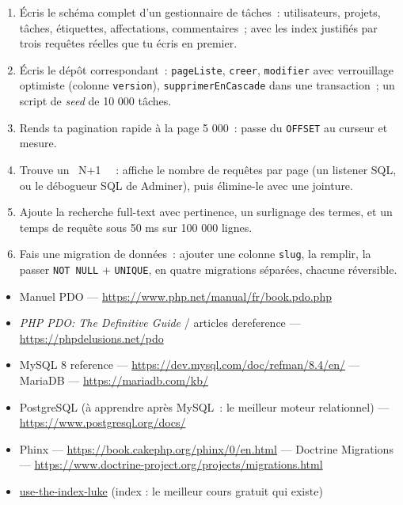 \documentclass[12pt,a4paper,twoside,openright]{book}
\newcommand{\link}[2]{\href{#2}{#1}}
\begin{document}
\begin{exercice}
\begin{enumerate}
  \item \'Ecris le sch\'ema complet d'un gestionnaire de t\^aches~: utilisateurs, projets, t\^aches,
        \'etiquettes, affectations, commentaires~; avec les index justifi\'es par trois requ\^etes
        r\'eelles que tu \'ecris en premier.
  \item \'Ecris le d\'ep\^ot correspondant~: \verb|pageListe|, \verb|creer|, \verb|modifier| avec
        verrouillage optimiste (colonne \verb|version|), \verb|supprimerEnCascade| dans une
        transaction~; un script de \emph{seed} de 10 000 t\^aches.
  \item Rends ta pagination rapide \`a la page 5 000~: passe du \verb|OFFSET| au curseur et mesure.
  \item Trouve un \og ~N+1~ \fg{}~: affiche le nombre de requ\^etes par page (un listener SQL, ou le
        d\'ebogueur SQL de Adminer), puis \'elimine-le avec une jointure.
  \item Ajoute la recherche full-text avec pertinence, un surlignage des termes, et un temps
        de requ\^ete sous 50 ms sur 100 000 lignes.
  \item Fais une migration de donn\'ees~: ajouter une colonne \verb|slug|, la remplir, la passer
        \verb|NOT NULL| + \verb|UNIQUE|, en quatre migrations s\'epar\'ees, chacune r\'eversible.
\end{enumerate}
\end{exercice}

\begin{ressources}
\begin{itemize}
  \item Manuel PDO --- \url{https://www.php.net/manual/fr/book.pdo.php}
  \item \emph{PHP PDO: The Definitive Guide} / articles dereference --- \url{https://phpdelusions.net/pdo}
  \item MySQL 8 reference --- \url{https://dev.mysql.com/doc/refman/8.4/en/} --- MariaDB --- \url{https://mariadb.com/kb/}
  \item PostgreSQL (\`a apprendre apr\`es MySQL~: le meilleur moteur relationnel) --- \url{https://www.postgresql.org/docs/}
  \item Phinx --- \url{https://book.cakephp.org/phinx/0/en.html} --- Doctrine Migrations --- \url{https://www.doctrine-project.org/projects/migrations.html}
  \item \link{use-the-index-luke}{https://use-the-index-luke.com/} (index : le meilleur cours gratuit qui existe)
\end{itemize}
\end{ressources}
\end{document}

